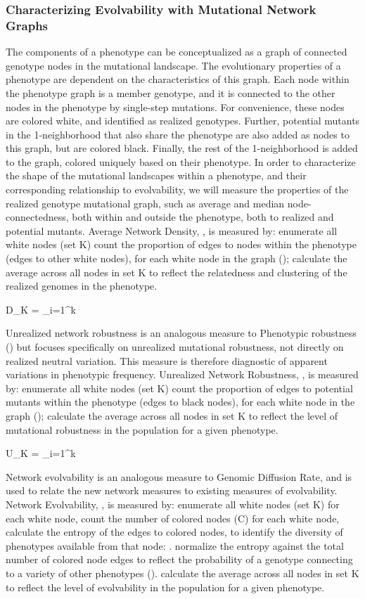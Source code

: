\subsubsection{Characterizing Evolvability with Mutational Network Graphs}

The components of a phenotype can be conceptualized as a graph of connected genotype nodes in the mutational landscape. The evolutionary properties of a phenotype are dependent on the characteristics of this graph.  Each node within the phenotype graph is a member genotype, and it is connected to the other nodes in the phenotype by single-step mutations. For convenience, these nodes are colored white, and identified as realized genotypes. Further, potential mutants in the 1-neighborhood that also share the phenotype are also added as nodes to this graph, but are colored black. Finally, the rest of the 1-neighborhood is added to the graph, colored uniquely based on their phenotype. 
In order to characterize the shape of the mutational landscapes within a phenotype, and their corresponding relationship to evolvability, we will measure the properties of the realized genotype mutational graph, such as average and median node-connectedness, both within and outside the phenotype, both to realized and potential mutants. 
Average Network Density, , is measured by:
enumerate all white nodes (set K)
count the proportion of edges to nodes within the phenotype (edges to other white nodes), for each white node in the graph ();
calculate the average across all nodes in set K to reflect the relatedness and clustering of the realized genomes in the phenotype.

D_{K} =  { \sum_{i=1}^{k}} 


Unrealized network robustness is an analogous measure to Phenotypic robustness () but focuses specifically on unrealized mutational robustness, not directly on realized neutral variation. This measure is therefore diagnostic of apparent variations in phenotypic frequency. 
Unrealized Network Robustness, , is measured by:
enumerate all white nodes (set K)
count the proportion of edges to potential mutants within the phenotype (edges to black nodes), for each white node in the graph ();
calculate the average across all nodes in set K to reflect the level of mutational robustness in the population for a given phenotype.

U_{K} =  { \sum_{i=1}^{k}} 


Network evolvability is an analogous measure to Genomic Diffusion Rate, and is used to relate the new network measures to existing measures of evolvability.
Network Evolvability, , is measured by:
enumerate all white nodes (set K)
for each white node, count the number of colored nodes (C)
for each white node, calculate the entropy of the edges to colored nodes, to identify the diversity of phenotypes available from that node: .
normalize the entropy against the total number of colored node edges to reflect the probability of a genotype connecting to a variety of other phenotypes ().
calculate the average across all nodes in set K to reflect the level of evolvability in the population for a given phenotype.

